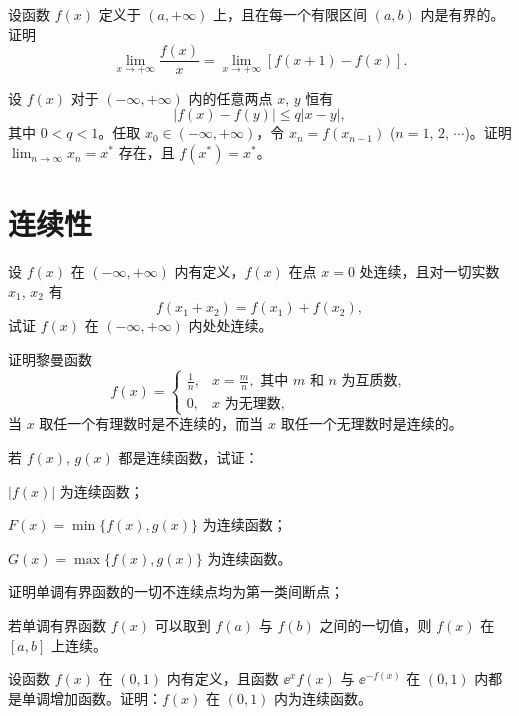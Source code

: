 	\begin{ti}
		设函数 $f(x)$ 定义于 $(a,+\infty)$ 上，且在每一个有限区间 $(a,b)$ 内是有界的。证明
		\[ \lim_{x \to +\infty} \frac{f(x)}{x} = \lim_{x \to +\infty} [f(x+1) - f(x)]. \]
	\end{ti}

	\begin{ti}
		设 $f(x)$ 对于 $(-\infty,+\infty)$ 内的任意两点 $x$, $y$ 恒有
		\[ |f(x) - f(y)| \leq q |x-y|, \]
		其中 $0<q<1$。任取 $x_0 \in (-\infty,+\infty)$，令 $x_n = f(x_{n-1})$ ($n=1$, $2$, $\cdots$)。证明 $\lim_{n \to \infty} x_n = x^*$ 存在，且 $f(x^*) = x^*$。
	\end{ti}

	\section{连续性}
	\begin{ti}
		设 $f(x)$ 在 $(-\infty,+\infty)$ 内有定义，$f(x)$ 在点 $x=0$ 处连续，且对一切实数 $x_1$, $x_2$ 有
		\[ f(x_1+x_2) = f(x_1) + f(x_2), \]
		试证 $f(x)$ 在 $(-\infty,+\infty)$ 内处处连续。
	\end{ti}

	\begin{ti}
		证明黎曼函数
		\[ f(x) = \begin{cases}
			\frac{1}{n}, & x=\frac{m}{n}, \text{ 其中 $m$ 和 $n$ 为互质数}, \\
			0, & x \text{ 为无理数},
		\end{cases} \]
		当 $x$ 取任一个有理数时是不连续的，而当 $x$ 取任一个无理数时是连续的。
	\end{ti}

	\begin{ti}
		若 $f(x)$, $g(x)$ 都是连续函数，试证：
		\begin{xiaoti}
			\item $|f(x)|$ 为连续函数；
			\item $F(x) = \min\{f(x),g(x)\}$ 为连续函数；
			\item $G(x) = \max\{f(x),g(x)\}$ 为连续函数。
		\end{xiaoti}
	\end{ti}

	\begin{ti}
		\begin{xiaoti}
			\item 证明单调有界函数的一切不连续点均为第一类间断点；
			\item 若单调有界函数 $f(x)$ 可以取到 $f(a)$ 与 $f(b)$ 之间的一切值，则 $f(x)$ 在 $[a,b]$ 上连续。
		\end{xiaoti}
	\end{ti}

	\begin{ti}
		设函数 $f(x)$ 在 $(0,1)$ 内有定义，且函数 $\ee^x f(x)$ 与 $\ee^{-f(x)}$ 在 $(0,1)$ 内都是单调增加函数。证明：$f(x)$ 在 $(0,1)$ 内为连续函数。
	\end{ti}